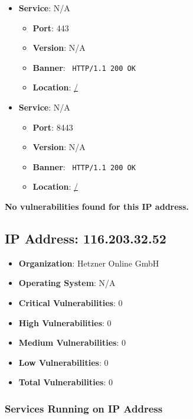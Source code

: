 \documentclass{article}
\begin{document}
\begin{itemize}
    
        \item \textbf{Service}: N/A
        \begin{itemize}
            \item \textbf{Port}: 443
            \item \textbf{Version}:  N/A 
            \item \textbf{Banner}: \texttt{ HTTP/1.1 200 OK
 }
            \item \textbf{Location}: \href{ / }{ / }
        \end{itemize}
    
        \item \textbf{Service}: N/A
        \begin{itemize}
            \item \textbf{Port}: 8443
            \item \textbf{Version}:  N/A 
            \item \textbf{Banner}: \texttt{ HTTP/1.1 200 OK
 }
            \item \textbf{Location}: \href{ / }{ / }
        \end{itemize}
    
\end{itemize}


\textbf{No vulnerabilities found for this IP address.}


\clearpage



\subsection*{IP Address: 116.203.32.52}

\begin{itemize}
    \item \textbf{Organization}: Hetzner Online GmbH
    \item \textbf{Operating System}:  N/A 
    \item \textbf{Critical Vulnerabilities}: 0
    \item \textbf{High Vulnerabilities}: 0
    \item \textbf{Medium Vulnerabilities}: 0
    \item \textbf{Low Vulnerabilities}: 0
    \item \textbf{Total Vulnerabilities}: 0
\end{itemize}

\subsubsection*{Services Running on IP Address}
\end{document}
